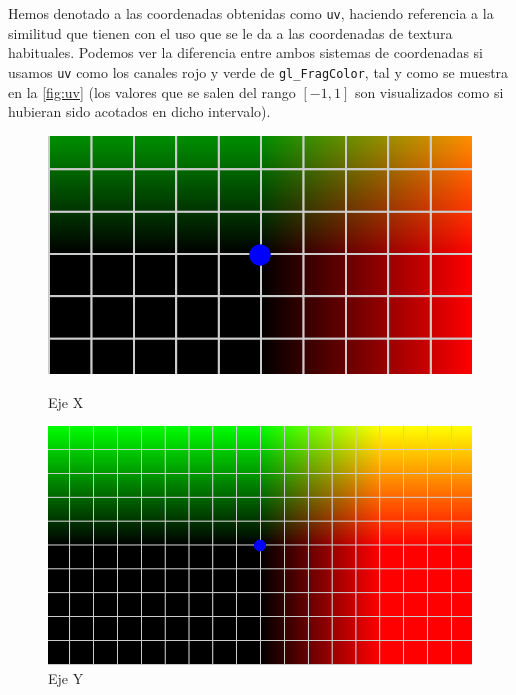 Hemos denotado a las coordenadas obtenidas como \texttt{uv}, haciendo referencia a la similitud que tienen con el uso que se le da a las coordenadas de textura habituales. Podemos ver la diferencia entre ambos sistemas de coordenadas si usamos \texttt{uv} como los canales rojo y verde de \texttt{gl\_FragColor}, tal y como se muestra en la \autoref{fig:uv} (los valores que se salen del rango $[-1,1]$ son visualizados como si hubieran sido acotados en dicho intervalo).\newline

\begin{figure}[htbp]
    \centering
    \begin{minipage}[b]{0.45\textwidth}
        \centering
        \includegraphics[width=\textwidth]{Plantilla-TFG-master/img/normX.png}
        \caption{Eje X}
    \end{minipage}
    \hfill
    \begin{minipage}[b]{0.45\textwidth}
        \centering
        \includegraphics[width=\textwidth]{Plantilla-TFG-master/img/normY.png}
        \caption{Eje Y}
    \end{minipage}
    

\end{figure}
